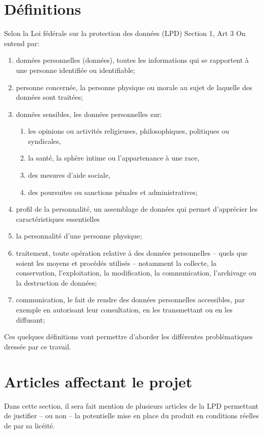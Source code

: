 \section{Définitions}
Selon la Loi fédérale sur la protection des données (LPD) Section 1, Art 3
On entend par:

\begin{enumerate}[label=\alph*]
\item données personnelles (données), toutes les informations qui se rapportent à une personne identifiée ou
identifiable;
\item personne concernée, la personne physique ou morale au sujet de laquelle des données sont traitées;
\item données sensibles, les données personnelles sur:
\begin{enumerate}[label=\alph*]
\item les opinions ou activités religieuses, philosophiques, politiques ou syndicales,
\item la santé, la sphère intime ou l’appartenance à une race,
\item des mesures d’aide sociale,
\item des poursuites ou sanctions pénales et administratives;
\end{enumerate}
\item profil de la personnalité, un assemblage de données qui permet d’apprécier les caractéristiques essentielles
\item la personnalité d’une personne physique;
\item traitement, toute opération relative à des données personnelles – quels que soient les moyens et procédés
utilisés – notamment la collecte, la conservation, l’exploitation, la modification, la communication,
l’archivage ou la destruction de données;
\item communication, le fait de rendre des données personnelles accessibles, par exemple en autorisant leur
consultation, en les transmettant ou en les diffusant;
\end{enumerate}

Ces quelques définitions vont permettre d’aborder les différentes problématiques dressée par ce travail.

\section{Articles affectant le projet}

Dans cette section, il sera fait mention de plusieurs articles de la LPD permettant de justifier – ou non – la potentielle
mise en place du produit en conditions réelles de par sa licéité.

